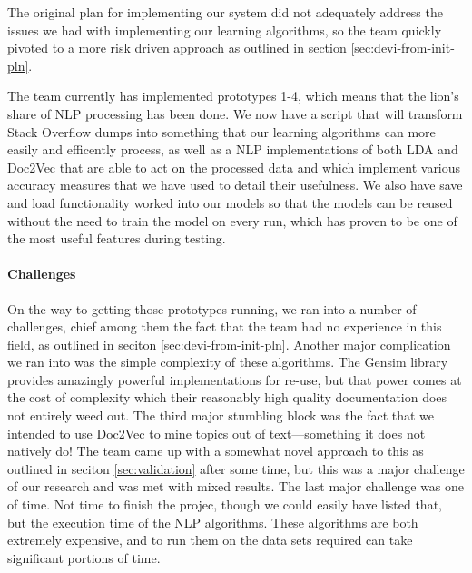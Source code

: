 
The original plan for implementing our system did not adequately
address the issues we had with implementing our learning algorithms,
so the team quickly pivoted to a more risk driven approach as outlined
in section \ref{sec:devi-from-init-pln}.

The team currently has implemented prototypes 1-4, which means that
the lion's share of NLP processing has been done.
We now have a script that will transform Stack Overflow dumps into
something that our learning algorithms can more easily and efficently
process, as well as a NLP implementations of both LDA and Doc2Vec that
are able to act on the processed data and which implement various
accuracy measures that we have used to detail their usefulness.
We also have save and load functionality worked into our models so
that the models can be reused without the need to train the model on
every run, which has proven to be one of the most useful features
during testing.  


\paragraph{Challenges}
On the way to getting those prototypes running, we ran into a number
of challenges, chief among them the fact that the team had no
experience in this field, as outlined in seciton \ref{sec:devi-from-init-pln}.
Another major complication we ran into was the simple complexity of
these algorithms.  The Gensim library provides amazingly powerful
implementations for re-use, but that power comes at the cost of
complexity which their reasonably high quality documentation does not
entirely weed out.
The third major stumbling block was the fact that we intended to use
Doc2Vec to mine topics out of text---something it does not natively
do!  
The team came up with a somewhat novel approach to this as outlined in
seciton \ref{sec:validation} after some time,
but this was a major challenge of our research and was met with mixed results.  
The last major challenge was one of time.
Not time to finish the projec, though we could easily have listed
that, but the execution time of the NLP algorithms.
These algorithms are both extremely expensive, and to run them on the
data sets required can take significant portions of time.

